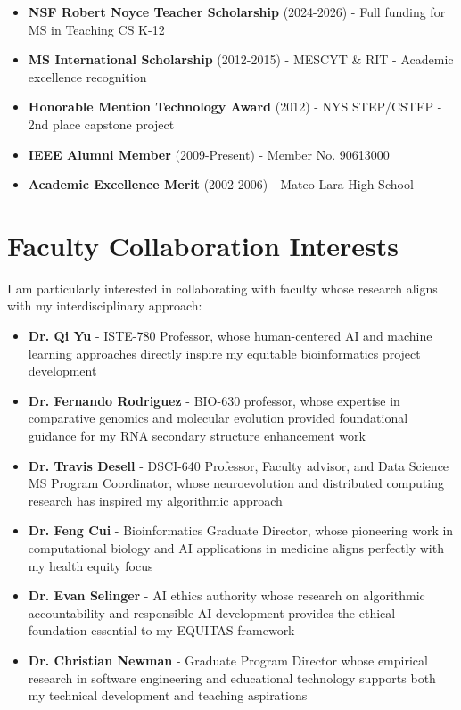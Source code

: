 \documentclass[10pt]{article}
\begin{document}
\begin{itemize}[leftmargin=*]
\item \textbf{NSF Robert Noyce Teacher Scholarship} (2024-2026) - Full funding for MS in Teaching CS K-12
\item \textbf{MS International Scholarship} (2012-2015) - MESCYT \& RIT - Academic excellence recognition
\item \textbf{Honorable Mention Technology Award} (2012) - NYS STEP/CSTEP - 2nd place capstone project
\item \textbf{IEEE Alumni Member} (2009-Present) - Member No. 90613000
\item \textbf{Academic Excellence Merit} (2002-2006) - Mateo Lara High School
\end{itemize}


\section{Faculty Collaboration Interests}

I am particularly interested in collaborating with faculty whose research aligns with my interdisciplinary approach:

\begin{itemize}[leftmargin=*]
\item \textbf{Dr. Qi Yu} - ISTE-780 Professor, whose human-centered AI and machine learning approaches directly inspire my equitable bioinformatics project development
\item \textbf{Dr. Fernando Rodriguez} - BIO-630 professor, whose expertise in comparative genomics and molecular evolution provided foundational guidance for my RNA secondary structure enhancement work
\item \textbf{Dr. Travis Desell} - DSCI-640 Professor, Faculty advisor, and Data Science MS Program Coordinator, whose neuroevolution and distributed computing research has inspired my algorithmic approach
\item \textbf{Dr. Feng Cui} - Bioinformatics Graduate Director, whose pioneering work in computational biology and AI applications in medicine aligns perfectly with my health equity focus
\item \textbf{Dr. Evan Selinger} - AI ethics authority whose research on algorithmic accountability and responsible AI development provides the ethical foundation essential to my EQUITAS framework
\item \textbf{Dr. Christian Newman} - Graduate Program Director whose empirical research in software engineering and educational technology supports both my technical development and teaching aspirations
\end{itemize}
\end{document}
